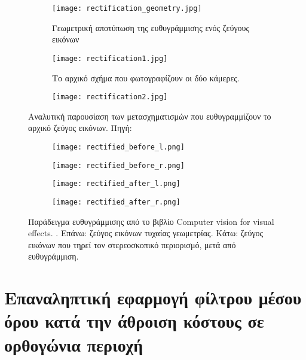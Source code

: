 \begin{figure}
	\centering
	\begin{subfigure}{.8\textwidth}
		\texttt{[image: rectification\_geometry.jpg]}
		\caption{Γεωμετρική αποτύπωση της ευθυγράμμισης ενός ζεύγους εικόνων}
	\end{subfigure}
	
	\begin{subfigure}{.25\textwidth}
		\texttt{[image: rectification1.jpg]}
		\caption{Το αρχικό σχήμα που φωτογραφίζουν οι δύο κάμερες.}
	\end{subfigure}
	\begin{subfigure}{.74\textwidth}
		\texttt{[image: rectification2.jpg]}
	\end{subfigure}
	\caption{Αναλυτική παρουσίαση των μετασχηματισμών που ευθυγραμμίζουν το αρχικό ζεύγος εικόνων. Πηγή: \citep{WikipediaRectification}}
	\label{fig:rectification_geometry}
\end{figure}

\begin{figure}
	\centering
	\begin{subfigure}{.49\textwidth}
		\texttt{[image: rectified\_before\_l.png]}
	\end{subfigure}
	\begin{subfigure}{.49\textwidth}
		\texttt{[image: rectified\_before\_r.png]}
	\end{subfigure}
	
	\begin{subfigure}{.49\textwidth}
		\texttt{[image: rectified\_after\_l.png]}
	\end{subfigure}
	\begin{subfigure}{.49\textwidth}
		\texttt{[image: rectified\_after\_r.png]}
	\end{subfigure}
	\caption{Παράδειγμα ευθυγράμμισης από το βιβλίο \e Computer vision for visual effects. \g \citep{radke2013computer}. Επάνω: ζεύγος εικόνων τυχαίας γεωμετρίας. Κάτω: ζεύγος εικόνων που τηρεί τον στερεοσκοπικό περιορισμό, μετά από ευθυγράμμιση.}
	\label{fig:rectification_example}
\end{figure}

\section{Επαναληπτική εφαρμογή φίλτρου μέσου όρου κατά την άθροιση κόστους σε ορθογώνια περιοχή}
\label{appendix:mean2gaussian}

